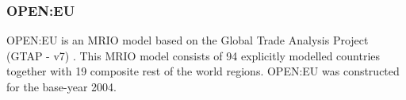 \subsubsection{OPEN:EU}

OPEN:EU is an MRIO model based on the Global Trade Analysis Project (GTAP - v7)  \cite{narayanan_global_2008} \cite{peters_constructing_2011}. 
This MRIO model consists of 94 explicitly modelled countries together with 19 composite rest of the world regions. OPEN:EU was constructed for the base-year 2004.

